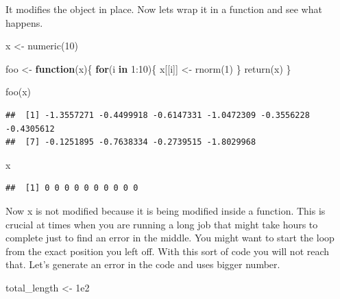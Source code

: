 \documentclass[
]{book}
\newenvironment{Shaded}{\begin{snugshade}}{\end{snugshade}}
\newcommand{\ControlFlowTok}[1]{\textcolor[rgb]{0.13,0.29,0.53}{\textbf{#1}}}
\newcommand{\DecValTok}[1]{\textcolor[rgb]{0.00,0.00,0.81}{#1}}
\newcommand{\FloatTok}[1]{\textcolor[rgb]{0.00,0.00,0.81}{#1}}
\newcommand{\FunctionTok}[1]{\textcolor[rgb]{0.00,0.00,0.00}{#1}}
\newcommand{\NormalTok}[1]{#1}
\newcommand{\OtherTok}[1]{\textcolor[rgb]{0.56,0.35,0.01}{#1}}
\newcommand{\SpecialCharTok}[1]{\textcolor[rgb]{0.00,0.00,0.00}{#1}}
\begin{document}
It modifies the object in place. Now lets wrap it in a function and see what happens.

\begin{Shaded}
\begin{Highlighting}[]
\NormalTok{x }\OtherTok{\textless{}{-}} \FunctionTok{numeric}\NormalTok{(}\DecValTok{10}\NormalTok{)}

\NormalTok{foo }\OtherTok{\textless{}{-}} \ControlFlowTok{function}\NormalTok{(x)\{}
  \ControlFlowTok{for}\NormalTok{(i }\ControlFlowTok{in} \DecValTok{1}\SpecialCharTok{:}\DecValTok{10}\NormalTok{)\{}
\NormalTok{    x[[i]] }\OtherTok{\textless{}{-}} \FunctionTok{rnorm}\NormalTok{(}\DecValTok{1}\NormalTok{)}
\NormalTok{  \}}
  \FunctionTok{return}\NormalTok{(x)}
\NormalTok{\}}

\FunctionTok{foo}\NormalTok{(x)}
\end{Highlighting}
\end{Shaded}

\begin{verbatim}
##  [1] -1.3557271 -0.4499918 -0.6147331 -1.0472309 -0.3556228 -0.4305612
##  [7] -0.1251895 -0.7638334 -0.2739515 -1.8029968
\end{verbatim}

\begin{Shaded}
\begin{Highlighting}[]
\NormalTok{x}
\end{Highlighting}
\end{Shaded}

\begin{verbatim}
##  [1] 0 0 0 0 0 0 0 0 0 0
\end{verbatim}

Now x is not modified because it is being modified inside a function. This is crucial at times when you are running a long job that might take hours to complete just to find an error in the middle. You might want to start the loop from the exact position you left off. With this sort of code you will not reach that. Let's generate an error in the code and uses bigger number.

\begin{Shaded}
\begin{Highlighting}[]
\NormalTok{total\_length }\OtherTok{\textless{}{-}} \FloatTok{1e2}
\end{Highlighting}
\end{Shaded}
\end{document}
